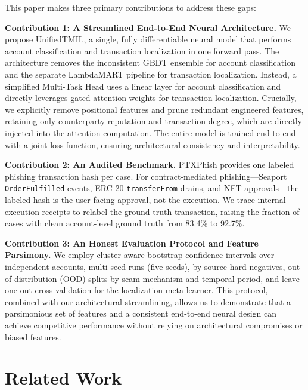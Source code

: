 \documentclass[conference]{IEEEtran}
\begin{document}
This paper makes three primary contributions to address these gaps:

\textbf{Contribution 1: A Streamlined End-to-End Neural Architecture.} We propose UnifiedTMIL, a single, fully differentiable neural model that performs account classification and transaction localization in one forward pass. The architecture removes the inconsistent GBDT ensemble for account classification and the separate LambdaMART pipeline for transaction localization. Instead, a simplified Multi-Task Head uses a linear layer for account classification and directly leverages gated attention weights for transaction localization. Crucially, we explicitly remove positional features and prune redundant engineered features, retaining only counterparty reputation and transaction degree, which are directly injected into the attention computation. The entire model is trained end-to-end with a joint loss function, ensuring architectural consistency and interpretability.

\textbf{Contribution 2: An Audited Benchmark.} PTXPhish \cite{ptxphish} provides one labeled phishing transaction hash per case. For contract-mediated phishing---Seaport \texttt{OrderFulfilled} events, ERC-20 \texttt{transferFrom} drains, and NFT approvals---the labeled hash is the user-facing approval, not the execution. We trace internal execution receipts to relabel the ground truth transaction, raising the fraction of cases with clean account-level ground truth from 83.4\% to 92.7\%.

\textbf{Contribution 3: An Honest Evaluation Protocol and Feature Parsimony.} We employ cluster-aware bootstrap confidence intervals over independent accounts, multi-seed runs (five seeds), by-source hard negatives, out-of-distribution (OOD) splits by scam mechanism and temporal period, and leave-one-out cross-validation for the localization meta-learner. This protocol, combined with our architectural streamlining, allows us to demonstrate that a parsimonious set of features and a consistent end-to-end neural design can achieve competitive performance without relying on architectural compromises or biased features.

\section{Related Work}
\end{document}
